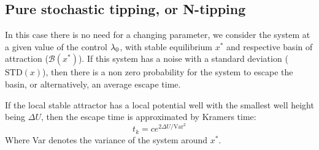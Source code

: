 



%
%

\subsection{Pure stochastic tipping, or N-tipping}

In this case there is no need for a changing parameter, we consider the system at a given value of the control $\lambda_0$, with stable equilibrium $x^*$  and respective basin of attraction ($\mathcal{B}(x^*)$). If this system has a noise with a standard deviation ($\mathrm{STD}(x)$), then there is a non zero probability for the system to escape the basin, or alternatively, an average escape time. 


If the local stable attractor has a local potential well with the smallest well height being $\Delta U$, then the  escape time is approximated by Kramers time: 
\begin{equation}
	t_k=c e^{2\Delta U/\mathrm{Var}^2}
\end{equation} 
Where Var denotes the variance of the system around $x^*$.


